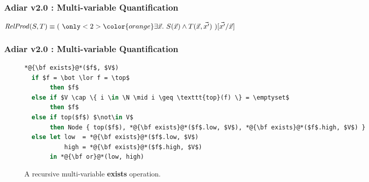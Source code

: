 \documentclass[english, aspectratio=169]{beamer}
\begin{document}
\begin{frame}{} %
  \begin{figure}
    \centering


    \begin{tikzpicture}
      
    \end{tikzpicture}
  \end{figure}
\end{frame}

\begin{frame}
  \frametitle{Adiar v2.0 : Multi-variable Quantification}

  \begin{center}
    \LARGE

    $\mathit{RelProd}(S,T)
    \equiv
    (
    \ {\only<2>{\color{orange}}\exists \vec{x} .}\
    S(\vec{x}) \wedge T(\vec{x}, \vec{x'})
    \ ) [\vec{x'} / \vec{x}]$
  \end{center}
\end{frame}

\begin{frame}[fragile]
  \frametitle{Adiar v2.0 : Multi-variable Quantification}

  \begin{figure}
    \centering

    \begin{lstlisting}[language=sml]
*@{\bf exists}@*($f$, $V$)
  if $f = \bot \lor f = \top$
       then $f$
  else if $V \cap \{ i \in \N \mid i \geq \texttt{top}(f) \} = \emptyset$
       then $f$
  else if top($f$) $\not\in V$
       then Node { top($f$), *@{\bf exists}@*($f$.low, $V$), *@{\bf exists}@*($f$.high, $V$) }
  else let low  = *@{\bf exists}@*($f$.low, $V$)
           high = *@{\bf exists}@*($f$.high, $V$)
       in *@{\bf or}@*(low, high)
    \end{lstlisting}
  \caption{A recursive multi-variable {\bf exists} operation.}
\end{figure}


\end{frame}
\end{document}
